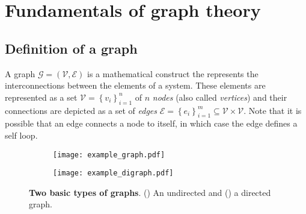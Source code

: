 \section{Fundamentals of graph theory}

\subsection{Definition of a graph}
A graph $\mathcal{G} = \left(\mathcal{V}, \mathcal{E}\right)$ is a mathematical construct the represents the interconnections between the elements of a system. These elements are represented as a set $ \mathcal{V}=\left\lbrace v_i\right\rbrace^n_{i=1}$ of $n$ \emph{nodes} (also called \emph{vertices}) and their connections are depicted as a set of \emph{edges} $ \mathcal{E}= \left\lbrace e_i\right\rbrace^m_{i=1} \subseteq \mathcal{V} \times \mathcal{V} $. Note that it is possible that an edge connects a node to itself, in which case the edge defines a self loop.
\begin{figure*}[!h]
	\centering	
	\hspace*{\fill}
	\begin{subfigure}[t]{0.32\textwidth}
		\subcaption{}
		\texttt{[image: example\_graph.pdf]}
		\label{fig:example_graph}
	\end{subfigure}	
	\hfill
	\begin{subfigure}[t]{0.32\textwidth}
		\subcaption{}
		\texttt{[image: example\_digraph.pdf]}
		\label{fig:example_digraph}
	\end{subfigure}
	\hspace*{\fill}	
	\caption[] {\label{fig:graph_examples} \textbf{Two basic types of graphs}. () An undirected and () a directed graph.}
\end{figure*}

